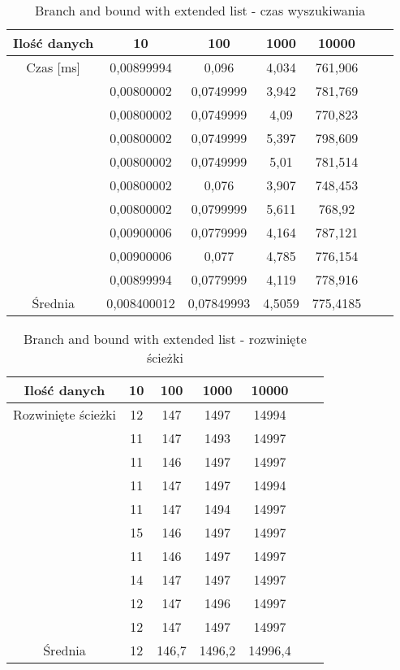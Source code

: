 \documentclass[10pt, a4paper]{article}
\begin{document}
\begin{flushleft}
\begin{table}[!h]
\centering
\caption{Branch and bound with extended list - czas wyszukiwania}
\begin{tabular}{|c|c|c|c|c|c|c|} \hline 
Ilość danych & 10 & 100 & 1000 & 10000 \\ \hline
Czas [ms] & 0,00899994 & 0,096 & 4,034 & 761,906 \\
& 0,00800002 & 0,0749999 & 3,942 & 781,769 \\
& 0,00800002 & 0,0749999 & 4,09 & 770,823 \\
& 0,00800002 & 0,0749999 & 5,397 & 798,609 \\
& 0,00800002 & 0,0749999 & 5,01 & 781,514 \\
& 0,00800002 & 0,076 & 3,907 & 748,453 \\
& 0,00800002 & 0,0799999 & 5,611 & 768,92 \\
& 0,00900006 & 0,0779999 & 4,164 & 787,121 \\
& 0,00900006 & 0,077 & 4,785 & 776,154 \\
& 0,00899994 & 0,0779999 & 4,119 & 778,916 \\ \hline
Średnia & 0,008400012 & 0,07849993 & 4,5059 & 775,4185 \\ \hline
\end{tabular}
\end{table}

\begin{table}[!h]
\centering
\caption{Branch and bound with extended list - rozwinięte ścieżki}
\begin{tabular}{|c|c|c|c|c|c|c|} \hline 
Ilość danych & 10 & 100 & 1000 & 10000 \\ \hline
Rozwinięte ścieżki & 12 & 147 & 1497 & 14994 \\
& 11 & 147 & 1493 & 14997 \\
& 11 & 146 & 1497 & 14997 \\
& 11 & 147 & 1497 & 14994 \\
& 11 & 147 & 1494 & 14997 \\
& 15 & 146 & 1497 & 14997 \\
& 11 & 146 & 1497 & 14997 \\
& 14 & 147 & 1497 & 14997 \\
& 12 & 147 & 1496 & 14997 \\
& 12 & 147 & 1497 & 14997 \\ \hline
Średnia & 12 & 146,7 & 1496,2 & 14996,4 \\ \hline
\end{tabular}
\end{table}


\end{flushleft}
\end{document}
